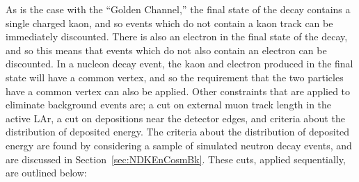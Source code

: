 As is the case with the ``Golden Channel,'' the final state of the decay contains a single charged kaon, and so events which do not contain a kaon track can be immediately discounted. There is also an electron in the final state of the decay, and so this means that events which do not also contain an electron can be discounted. In a nucleon decay event, the kaon and electron produced in the final state will have a common vertex, and so the requirement that the two particles have a common vertex can also be applied. Other constraints that are applied to eliminate background events are; a cut on external muon track length in the active LAr, a cut on depositions near the detector edges, and criteria about the distribution of deposited energy. The criteria about the distribution of deposited energy are found by considering a sample of simulated neutron decay events, and are discussed in Section~\ref{sec:NDKEnCosmBk}. These cuts, applied sequentially, are outlined below:
